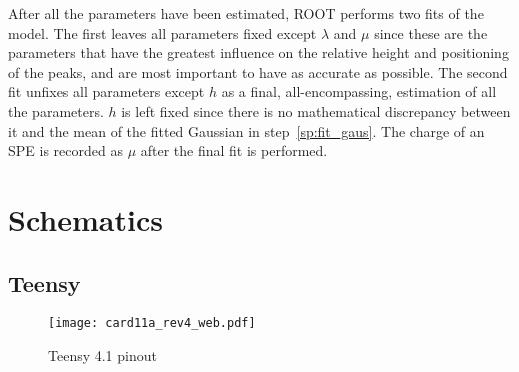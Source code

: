 \documentclass[12pt,openright,twoside]{report}
\begin{document}
After all the parameters have been estimated, ROOT performs two fits of the
model. The first leaves all parameters fixed except $\lambda$ and $\mu$ since
these are the parameters that have the greatest influence on the relative
height and positioning of the peaks, and are most important to have as accurate
as possible. The second fit unfixes all parameters except $h$ as a final,
all-encompassing, estimation of all the parameters. $h$ is left fixed since
there is no mathematical discrepancy between it and the mean of the fitted
Gaussian in step~\ref{sp:fit_gaus}. The charge of an SPE is recorded as $\mu$
after the final fit is performed.

\chapter{Schematics}










\section{Teensy}
\begin{figure}[!ht]
\centering
\texttt{[image: card11a\_rev4\_web.pdf]}
\caption{Teensy 4.1 pinout}
\label{teensy-pinout}
\end{figure}
\printbibliography
\appendix
\end{document}
